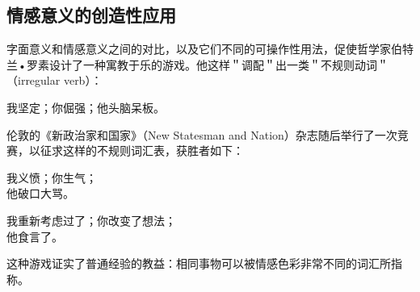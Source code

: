 \subsection{情感意义的创造性应用}

字面意义和情感意义之间的对比，以及它们不同的可操作性用法，促使哲学家伯特兰•罗素设计了一种寓教于乐的游戏。他这样＂调配＂出一类＂不规则动词＂（irregular verb）：

我坚定；你倔强；他头脑呆板。

伦敦的《新政治家和国家》（New Statesman and Nation）杂志随后举行了一次竞赛，以征求这样的不规则词汇表，获胜者如下：

我义愤；你生气；\\
他破口大骂。

我重新考虑过了；你改变了想法；\\
他食言了。

这种游戏证实了普通经验的教益：相同事物可以被情感色彩非常不同的词汇所指称。 

